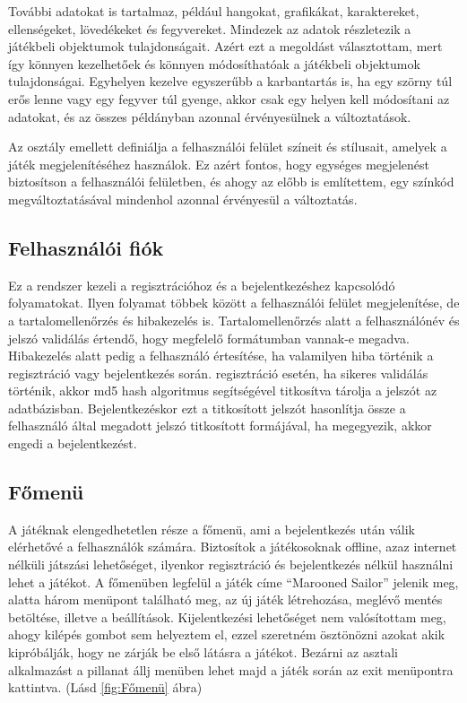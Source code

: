 További adatokat is tartalmaz, például hangokat, grafikákat, karaktereket, ellenségeket, lövedékeket és fegyvereket. Mindezek az adatok részletezik a játékbeli objektumok tulajdonságait. Azért ezt a megoldást választottam, mert így könnyen kezelhetőek és könnyen módosíthatóak a játékbeli objektumok tulajdonságai. Egyhelyen kezelve egyszerűbb a karbantartás is, ha egy szörny túl erős lenne vagy egy fegyver túl gyenge, akkor csak egy helyen kell módosítani az adatokat, és az összes példányban azonnal érvényesülnek a változtatások.

Az osztály emellett definiálja a felhasználói felület színeit és stílusait, amelyek a játék megjelenítéséhez használok. Ez azért fontos, hogy egységes megjelenést biztosítson a felhasználói felületben, és ahogy az előbb is említettem, egy színkód megváltoztatásával mindenhol azonnal érvényesül a változtatás.


\subsection{Felhasználói fiók}
 Ez a rendszer kezeli a regisztrációhoz és a bejelentkezéshez kapcsolódó folyamatokat. Ilyen folyamat többek között a felhasználói felület megjelenítése, de a tartalomellenőrzés és hibakezelés is. Tartalomellenőrzés alatt a felhasználónév és jelszó validálás értendő, hogy megfelelő formátumban vannak-e megadva. Hibakezelés alatt pedig a felhasználó értesítése, ha valamilyen hiba történik a regisztráció vagy bejelentkezés során. regisztráció esetén, ha sikeres validálás történik, akkor md5 hash algoritmus segítségével titkosítva tárolja a jelszót az adatbázisban. Bejelentkezéskor ezt a titkosított jelszót hasonlítja össze a felhasználó által megadott jelszó titkosított formájával, ha megegyezik, akkor engedi a bejelentkezést.

\subsection{Főmenü}

 A játéknak elengedhetetlen része a főmenü, ami a bejelentkezés után válik elérhetővé a felhasználók számára. Biztosítok a játékosoknak offline, azaz internet nélküli játszási lehetőséget, ilyenkor regisztráció és bejelentkezés nélkül használni lehet a játékot.
A főmenüben legfelül a játék címe ``Marooned Sailor'' jelenik meg, alatta három menüpont található meg, az új játék létrehozása, meglévő mentés betöltése, illetve a beállítások. Kijelentkezési lehetőséget nem valósítottam meg, ahogy kilépés gombot sem helyeztem el, ezzel szeretném ösztönözni azokat akik kipróbálják, hogy ne zárják be első látásra a játékot. Bezárni az asztali alkalmazást a pillanat állj menüben lehet majd a játék során az exit menüpontra kattintva. (Lásd \ref{fig:Főmenü} ábra) 

